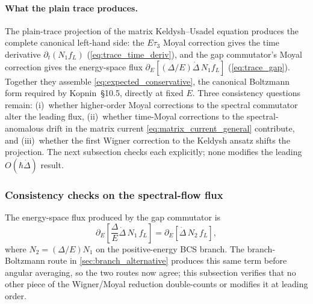 \documentclass[
  aps,
  prb,
  preprint,
  superscriptaddress,
  longbibliography,
  nofootinbib
]{revtex4-2}
\newcommand{\DOS}{N_1}
\newcommand{\fL}{f_L}
\begin{document}
\paragraph{What the plain trace produces.} The plain-trace projection of
the matrix Keldysh--Usadel equation produces the complete canonical
left-hand side: the \(E\tau_3\) Moyal correction gives the time
derivative \(\partial_t(\DOS\fL)\) (\cref{eq:trace_time_deriv}), and the
gap commutator's Moyal correction gives the energy-space flux
\(\partial_E[(\Delta/E)\dot\Delta\,\DOS\fL]\) (\cref{eq:trace_gap}).
Together they assemble \cref{eq:expected_conservative}, the canonical
Boltzmann form required by Kopnin~\S 10.5, directly at fixed \(E\). Three
consistency questions remain:
(i)~whether higher-order Moyal corrections to the spectral commutator
alter the leading flux,
(ii)~whether time-Moyal corrections to the spectral-anomalous drift in the
matrix current \cref{eq:matrix_current_general} contribute, and
(iii)~whether the first Wigner correction to the Keldysh ansatz shifts the
projection. The next subsection checks each explicitly; none modifies the
leading \(O(\hbar\dot\Delta)\) result.

\subsubsection{Consistency checks on the spectral-flow flux}
\label{sec:tdep_candidate_tests}

The energy-space flux produced by the gap commutator is
\begin{equation}
  \partial_E\!\left[
    \frac{\Delta}{E}\dot\Delta\,\DOS\,\fL
  \right]
  =
  \partial_E\!\left[\dot\Delta\,N_2\,\fL\right],
  \label{eq:missing_flux_N2}
\end{equation}
where \(N_2=(\Delta/E)\DOS\) on the positive-energy BCS branch. The
branch-Boltzmann route in \cref{sec:branch_alternative} produces this same
term before angular averaging, so the two routes now agree; this
subsection verifies that no other piece of the Wigner/Moyal reduction
double-counts or modifies it at leading order.
\end{document}
